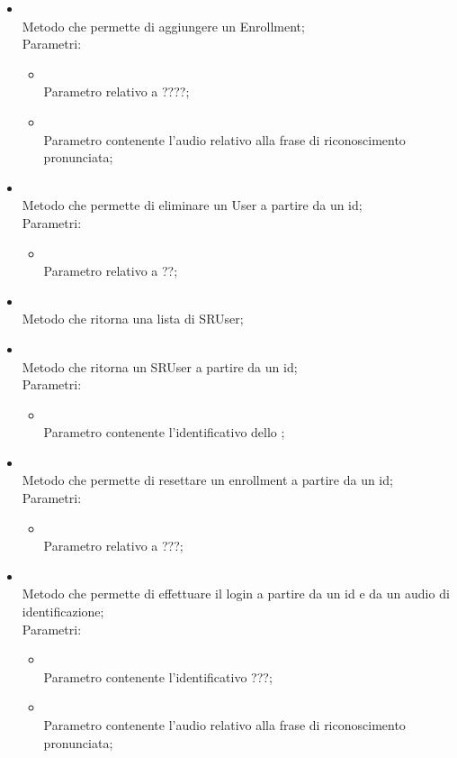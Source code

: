 \begin{itemize}
\begin{itemize}
		\item[]  \\
		Metodo che permette di aggiungere un Enrollment;\\
		Parametri:
		\begin{itemize}
			\item {} \\
			Parametro relativo a ????;
			\item {} \\
			Parametro contenente l'audio relativo alla frase di riconoscimento pronunciata;
		\end{itemize}
		\item[]  \\
		Metodo che permette di eliminare un User a partire da un id;\\
		Parametri:
		\begin{itemize}
			\item {} \\
			Parametro relativo a ??;
		\end{itemize}
		\item[]  \\
		Metodo che ritorna una lista di SRUser;\\
		\item[]  \\
		Metodo che ritorna un SRUser a partire da un id;\\
		Parametri:
		\begin{itemize}
			\item {} \\
			Parametro contenente l'identificativo dello ;
		\end{itemize}
		\item[]  \\
		Metodo che permette di resettare un enrollment a partire da un id;\\
		Parametri:
		\begin{itemize}
			\item {} \\
			Parametro relativo a ???;
		\end{itemize}
		\item[]  \\
		Metodo che permette di effettuare il login a partire da un id e da un audio di identificazione;\\
		Parametri:
		\begin{itemize}
			\item {} \\
			Parametro contenente l'identificativo ???;
			\item {} \\
			Parametro contenente l'audio relativo alla frase di riconoscimento pronunciata;
		\end{itemize}
	\end{itemize}
\end{itemize}
